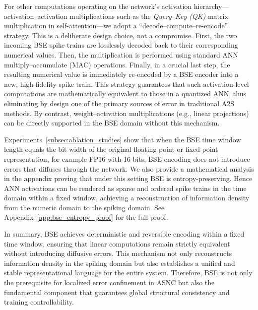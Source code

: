 \documentclass{article}
\theoremstyle{plain}
\theoremstyle{definition}
\theoremstyle{remark}
\begin{document}
For other computations operating on the network’s activation hierarchy—activation–activation multiplications such as the \textit{Query–Key (QK)} matrix multiplication in self-attention—we adopt a ``decode–compute–re-encode'' strategy. This is a deliberate design choice, not a compromise. First, the two incoming BSE spike trains are losslessly decoded back to their corresponding numerical values. Then, the multiplication is performed using standard ANN multiply–accumulate (MAC) operations. Finally, in a crucial last step, the resulting numerical value is immediately re-encoded by a BSE encoder into a new, high-fidelity spike train. This strategy guarantees that such activation-level computations are mathematically equivalent to those in a quantized ANN, thus eliminating by design one of the primary sources of error in traditional A2S methods. By contrast, weight–activation multiplications (e.g., linear projections) can be directly supported in the BSE domain without this mechanism.

Experiments~\ref{subsec:ablation_studies} show that when the BSE time window length equals the bit width of the original floating-point or fixed-point representation, for example FP16 with 16 bits, BSE encoding does not introduce errors that diffuses through the network. We also provide a mathematical analysis in the appendix proving that under this setting BSE is entropy-preserving. Hence ANN activations can be rendered as sparse and ordered spike trains in the time domain within a fixed window, achieving a reconstruction of information density from the numeric domain to the spiking domain. See Appendix~\ref{app:bse_entropy_proof} for the full proof.

In summary, BSE achieves deterministic and reversible encoding within a fixed time window, ensuring that linear computations remain strictly equivalent without introducing diffusive errors. This mechanism not only reconstructs information density in the spiking domain but also establishes a unified and stable representational language for the entire system. Therefore, BSE is not only the prerequisite for localized error confinement in ASNC but also the fundamental component that guarantees global structural consistency and training controllability.
\end{document}
